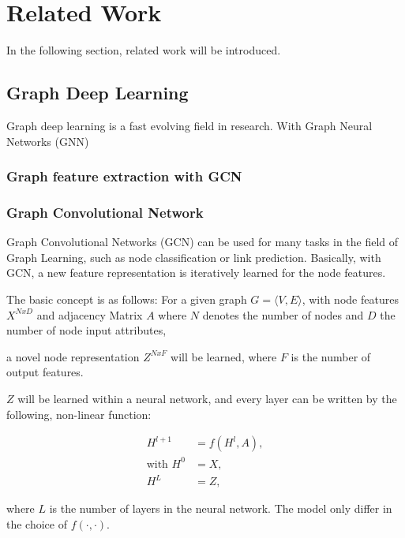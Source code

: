 \chapter{Related Work}
\label{sec:relatedWork}

In the following section, related work will be introduced.


\section{Graph Deep Learning}
Graph deep learning is a fast evolving field in research. With Graph Neural Networks (GNN)

\cite{GNN}
\cite{GAT}

\subsection{Graph feature extraction with GCN}

\subsection{Graph Convolutional Network}
Graph Convolutional Networks (GCN) \cite{GCN} can be used for many tasks in the field 
of Graph Learning, such as node classification or link prediction. 
Basically, with GCN, a new feature representation is iteratively learned for the node features.

The basic concept is as follows:
For a given graph $G = \langle V,E \rangle$, with node features $X^{N x D}$ and adjacency Matrix $A$
where $N$ denotes the number of nodes and $D$ the number of node input attributes,

a novel node representation $Z^{N x F}$ will be learned, where $F$ is the number of output features.

$Z$ will be learned within a neural network, and every layer can be written by the following, non-linear function:

\begin{equation}
    \begin{aligned}
        H^{l + 1} &= f( H^l, A), \\
        \text{with } H^0 &= X , \\
        H^L &= Z, 
    \end{aligned}
\end{equation}

where $L$ is the number of layers in the neural network.
The model only differ in the choice of $f(\cdot,\cdot)$.

